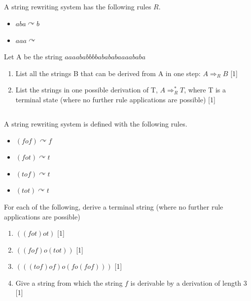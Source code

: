 \documentclass[twocolumn]{article}
\newcounter{pmarks}
\newcounter{marks}
\newcommand\mrk[1]{{\hfill\color{blue}\small[{#1}]}\addtocounter{pmarks}{#1}\addtocounter{marks}{#1}}
\begin{document}
\subsection{}

    A string rewriting system has the following rules $R$.

    \begin{itemize}
        \item $aba \curvearrowright b$
        \item $aaa \curvearrowright $
    \end{itemize}

    Let A be the string $aaaababbbbabababaaaababa$

    \begin{enumerate}
        \item List all the strings B that can be derived from A in one step: $A \Rightarrow_R B$ \mrk{1}
        \item List the strings in one possible derivation of T, $A \Rightarrow^*_R T$, where T is a terminal state (where no further rule applications are possible) \mrk{1}
    \end{enumerate}

\subsection{}

    A string rewriting system is defined with the following rules.

    \begin{multicols}{2}
    \begin{itemize}
        \item $(fof) \curvearrowright f$
        \item $(fot) \curvearrowright t$
        \item $(tof) \curvearrowright t$
        \item $(tot) \curvearrowright t$
    \end{itemize}
\end{multicols}

    For each of the following, derive a terminal string (where no further rule applications are possible)

    \begin{enumerate}
        \item $((fot)ot)$ \mrk{1}
        \item $((fof)o(tot))$ \mrk{1}
        \item $(((tof)of)o(fo(fof)))$ \mrk{1}
        \item Give a string from which the string $f$ is derivable by a derivation of length 3 \mrk{1}
    \end{enumerate}
\end{document}
